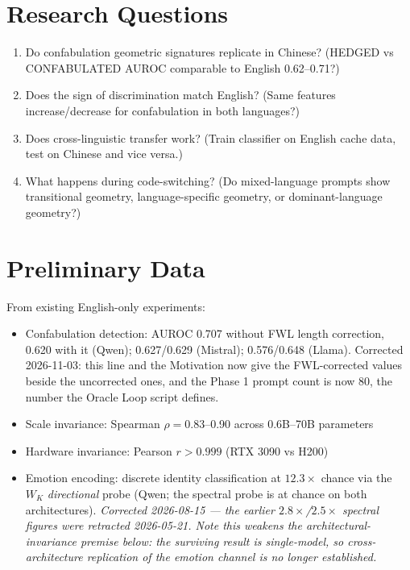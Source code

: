 \documentclass[11pt,letterpaper]{article}
\begin{document}
\section{Research Questions}

\begin{enumerate}[leftmargin=*]
  \item Do confabulation geometric signatures replicate in Chinese? (HEDGED vs CONFABULATED AUROC comparable to English 0.62--0.71?)
  \item Does the sign of discrimination match English? (Same features increase/decrease for confabulation in both languages?)
  \item Does cross-linguistic transfer work? (Train classifier on English cache data, test on Chinese and vice versa.)
  \item What happens during code-switching? (Do mixed-language prompts show transitional geometry, language-specific geometry, or dominant-language geometry?)
\end{enumerate}

\section{Preliminary Data}

From existing English-only experiments:
\begin{itemize}
  \item Confabulation detection: AUROC 0.707 without FWL length correction, 0.620 with it (Qwen); 0.627/0.629 (Mistral); 0.576/0.648 (Llama). Corrected 2026-11-03: this line and the Motivation now give the FWL-corrected values beside the uncorrected ones, and the Phase 1 prompt count is now 80, the number the Oracle Loop script defines.
  \item Scale invariance: Spearman $\rho = 0.83$--0.90 across 0.6B--70B parameters
  \item Hardware invariance: Pearson $r > 0.999$ (RTX 3090 vs H200)
  \item Emotion encoding: discrete identity classification at $12.3\times$ chance
  via the $W_K$ \emph{directional} probe (Qwen; the spectral probe is at chance on both
  architectures). \emph{Corrected 2026-08-15 --- the earlier $2.8\times$/$2.5\times$
  spectral figures were retracted 2026-05-21. Note this weakens the architectural-
  invariance premise below: the surviving result is single-model, so cross-architecture
  replication of the emotion channel is no longer established.}
\end{itemize}
\end{document}
